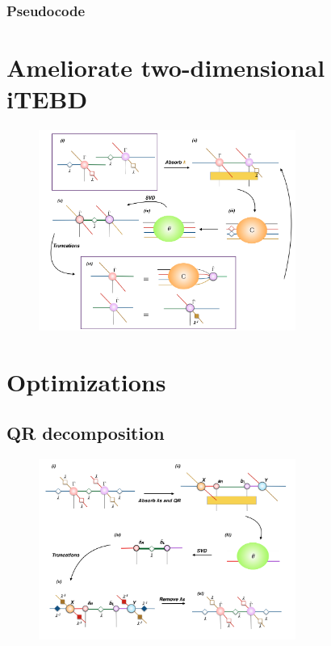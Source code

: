 \subsubsection{Pseudocode}

\section{Ameliorate two-dimensional iTEBD}
\label{2dhastin}

	\begin{figure}[ht]
	\centering
	\includegraphics[width=0.75\textwidth]{figures/fig316.png}
	\caption[The tensor network diagrams for the 2-D iTEBD which is ameliorated by Hestins]{}
	\label{fig316}
	\end{figure}

\section{Optimizations}
\label{2dopt}

\subsection{QR decomposition}
\label{2doptQR}
	\begin{figure}[ht]
	\centering
	\includegraphics[width=0.75\textwidth]{figures/fig317.png}
	\caption[The tensor network diagrams for the 2-D iTEBD with QR decomposition]{}
	\label{fig317}
	\end{figure}

